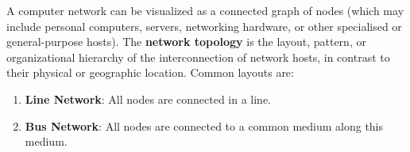\documentclass{article}
\begin{document}
  A computer network can be visualized as a connected graph of nodes (which may include personal computers, servers, networking hardware, or other specialised or general-purpose hosts). The \textbf{network topology} is the layout, pattern, or organizational hierarchy of the interconnection of network hosts, in contrast to their physical or geographic location. Common layouts are: 
  \begin{enumerate}
      \item \textbf{Line Network}: All nodes are connected in a line. 
  \begin{center}
  \end{center}
      \item \textbf{Bus Network}: All nodes are connected to a common medium along this medium. 


\end{enumerate}
\end{document}
